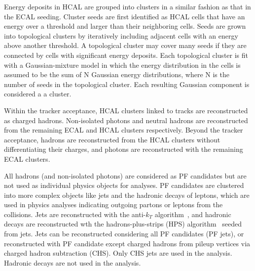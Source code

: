 Energy deposits in HCAL are grouped into clusters in a similar fashion as that in the ECAL seeding.
Cluster seeds are first identified as HCAL cells that have an energy over a threshold and larger than their neighboring cells.
Seeds are grown into topological clusters by iteratively including adjacent cells with an energy above another threshold.
A topological cluster may cover many seeds if they are connected by cells with significant energy deposits.
Each topological cluster is fit with a Gaussian-mixture model in which the energy distribution in the cells is assumed to be 
the sum of N Gaussian energy distributions, where N is the number of seeds in the topological cluster.
Each resulting Gaussian component is considered a a cluster.

Within the tracker acceptance, HCAL clusters linked to tracks are reconstructed as charged hadrons. 
Non-isolated photons and neutral hadrons are reconstructed from the remaining ECAL and HCAL clusters respectively.
Beyond the tracker acceptance, hadrons are reconstructed from the HCAL clusters without differentiating their charges,
and photons are reconstructed with the remaining ECAL clusters.

All hadrons (and non-isolated photons) are considered as PF candidates but are not used as individual physics objects for analyses.
PF candidates are clustered into more complex objects like jets and the hadronic decays of \tau{} leptons,
which are used in physics analyses indicating outgoing partons or \tau{} leptons from the collisions.  
Jets are reconstructed with the anti-$k_{T}$ algorithm~\cite{Cacciari_2008, fastjet}, 
and hadronic \tau{} decays are reconstructed wth the hadrons-plus-strips (HPS) algorithm~\cite{tau2016, tau2018} seeded from jets.
Jets can be reconstructed considering all PF candidates (PF jets), 
or reconstructed with PF candidate except charged hadrons from pileup vertices via charged hadron subtraction (CHS).
Only CHS jets are used in the \hmm analysis.%
Hadronic \tau{} decays are not used in the \hmm analysis.


